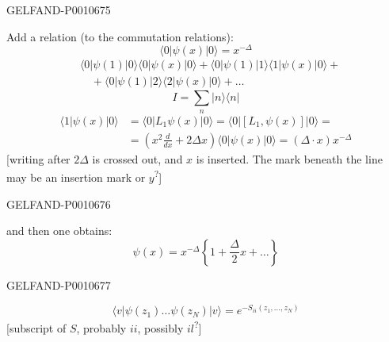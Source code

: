 \begin{GelfandAdjacentEvidence}{GELFAND-P001067}{5}


Add a relation (to the commutation relations):
\begin{equation*}
\langle0|\psi(x)|0\rangle=x^{-\Delta}
\tag{26}
\end{equation*}
\begin{equation*}
\begin{aligned}
&\langle0|\psi(1)|0\rangle\langle0|\psi(x)|0\rangle+
\langle0|\psi(1)|1\rangle\langle1|\psi(x)|0\rangle+\\
&\quad+\langle0|\psi(1)|2\rangle\langle2|\psi(x)|0\rangle+\ldots
\end{aligned}
\tag{27}
\end{equation*}
\begin{equation*}
I=\sum_n|n\rangle\langle n|
\end{equation*}
\begin{equation*}
\begin{aligned}
\langle1|\psi(x)|0\rangle
&=\langle0|L_1\psi(x)|0\rangle
=\langle0|[L_1,\psi(x)]|0\rangle=\\
&=\left(x^2\frac{d}{dx}+2\Delta x\right)\langle0|\psi(x)|0\rangle
=(\Delta\cdot x)x^{-\Delta}
\end{aligned}
\end{equation*}
[writing after \(2\Delta\) is crossed out, and \(x\) is inserted. The mark beneath the line may be an insertion mark or \(y\)\textsuperscript{?}]
\end{GelfandAdjacentEvidence}
\begin{GelfandAdjacentEvidence}{GELFAND-P001067}{6}


and then one obtains:
\begin{equation*}
\psi(x)=x^{-\Delta}\left\{1+\frac{\Delta}{2}x+\ldots\right\}
\end{equation*}
\end{GelfandAdjacentEvidence}
\begin{GelfandAdjacentEvidence}{GELFAND-P001067}{7}

\begin{equation*}
\langle v|\psi(z_1)\ldots\psi(z_N)|v\rangle=e^{-S_{ii}(z_1,\ldots,z_N)}
\end{equation*}
[subscript of \(S\), probably \(ii\), possibly \(il\)\textsuperscript{?}]
\end{GelfandAdjacentEvidence}

